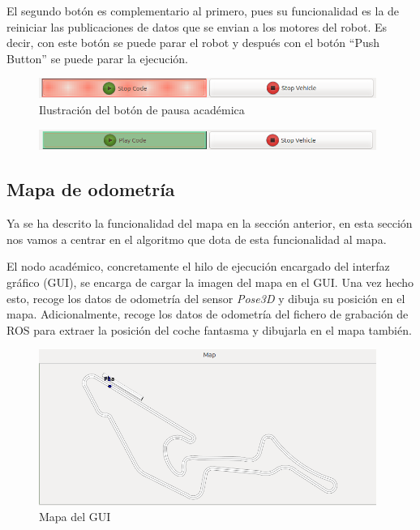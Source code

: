 El segundo botón es complementario al primero, pues su funcionalidad es la de reiniciar las publicaciones de datos que se envian a los motores del robot. Es decir, con este botón se puede parar el robot y después con el botón ``Push Button'' se puede parar la ejecución.

\begin{figure}[H]
	\begin{center}
	    \includegraphics[width=0.98\textwidth]{figures/boton_pausa_chrono.png}
		\caption{Ilustración del botón de pausa académica}
		\label{fig.bpch}
	\end{center}
\end{figure}
\begin{figure}[H]
	\begin{center}
        \includegraphics[width=0.98\textwidth]{figures/boton_start_chrono.png}
		\label{fig.bsch}
	\end{center}
\end{figure}


\subsection{Mapa de odometría}
Ya se ha descrito la funcionalidad del mapa en la sección anterior, en esta sección nos vamos a centrar en el algoritmo que dota de esta funcionalidad al mapa.

El nodo académico, concretamente el hilo de ejecución encargado del interfaz gráfico (GUI), se encarga de cargar la imagen del mapa en el GUI. Una vez hecho esto, recoge los datos de odometría del sensor \textit{Pose3D} y dibuja su posición en el mapa. Adicionalmente, recoge los datos de odometría del fichero de grabación de ROS para extraer la posición del coche fantasma y dibujarla en el mapa también.

\begin{figure}[H]
  \begin{center}
    \includegraphics[width=0.98\textwidth]{figures/mapa_chrono.png}
		\caption{Mapa del GUI}
		\label{fig.mapach}
		\end{center}
\end{figure}

